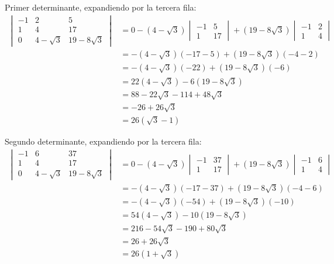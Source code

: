 \documentclass{article}
\begin{document}
Primer determinante, expandiendo por la tercera fila:
\begin{align}
\begin{vmatrix}
-1 & 2 & 5 \\
1 & 4 & 17 \\
0 & 4-\sqrt{3} & 19-8\sqrt{3}
\end{vmatrix} &= 0 - (4-\sqrt{3}) \begin{vmatrix} -1 & 5 \\ 1 & 17 \end{vmatrix} + (19-8\sqrt{3}) \begin{vmatrix} -1 & 2 \\ 1 & 4 \end{vmatrix} \\
&= -(4-\sqrt{3})(-17-5) + (19-8\sqrt{3})(-4-2) \\
&= -(4-\sqrt{3})(-22) + (19-8\sqrt{3})(-6) \\
&= 22(4-\sqrt{3}) - 6(19-8\sqrt{3}) \\
&= 88 - 22\sqrt{3} - 114 + 48\sqrt{3} \\
&= -26 + 26\sqrt{3} \\
&= 26(\sqrt{3} - 1)
\end{align}

Segundo determinante, expandiendo por la tercera fila:
\begin{align}
\begin{vmatrix}
-1 & 6 & 37 \\
1 & 4 & 17 \\
0 & 4-\sqrt{3} & 19-8\sqrt{3}
\end{vmatrix} &= 0 - (4-\sqrt{3}) \begin{vmatrix} -1 & 37 \\ 1 & 17 \end{vmatrix} + (19-8\sqrt{3}) \begin{vmatrix} -1 & 6 \\ 1 & 4 \end{vmatrix} \\
&= -(4-\sqrt{3})(-17-37) + (19-8\sqrt{3})(-4-6) \\
&= -(4-\sqrt{3})(-54) + (19-8\sqrt{3})(-10) \\
&= 54(4-\sqrt{3}) - 10(19-8\sqrt{3}) \\
&= 216 - 54\sqrt{3} - 190 + 80\sqrt{3} \\
&= 26 + 26\sqrt{3} \\
&= 26(1 + \sqrt{3})
\end{align}
\end{document}
